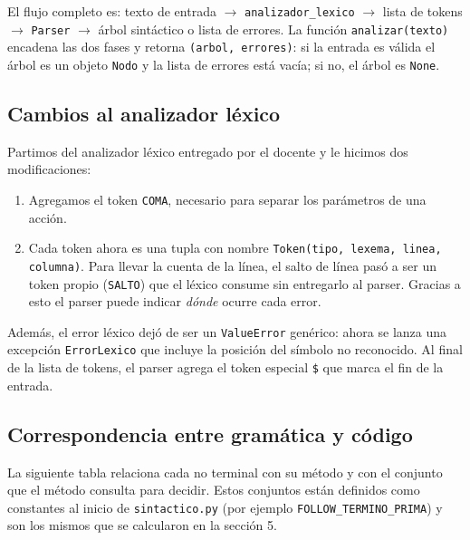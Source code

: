 El flujo completo es: texto de entrada $\rightarrow$ \texttt{analizador\_lexico} $\rightarrow$ lista de tokens $\rightarrow$ \texttt{Parser} $\rightarrow$ árbol sintáctico o lista de errores. La función \texttt{analizar(texto)} encadena las dos fases y retorna \texttt{(arbol, errores)}: si la entrada es válida el árbol es un objeto \texttt{Nodo} y la lista de errores está vacía; si no, el árbol es \texttt{None}.

\subsection{Cambios al analizador léxico}

Partimos del analizador léxico entregado por el docente y le hicimos dos modificaciones:

\begin{enumerate}
    \item Agregamos el token \texttt{COMA}, necesario para separar los parámetros de una acción.
    \item Cada token ahora es una tupla con nombre \texttt{Token(tipo, lexema, linea, columna)}. Para llevar la cuenta de la línea, el salto de línea pasó a ser un token propio (\texttt{SALTO}) que el léxico consume sin entregarlo al parser. Gracias a esto el parser puede indicar \emph{dónde} ocurre cada error.
\end{enumerate}

Además, el error léxico dejó de ser un \texttt{ValueError} genérico: ahora se lanza una excepción \texttt{ErrorLexico} que incluye la posición del símbolo no reconocido. Al final de la lista de tokens, el parser agrega el token especial \texttt{\$} que marca el fin de la entrada.

\subsection{Correspondencia entre gramática y código}

La siguiente tabla relaciona cada no terminal con su método y con el conjunto que el método consulta para decidir. Estos conjuntos están definidos como constantes al inicio de \texttt{sintactico.py} (por ejemplo \texttt{FOLLOW\_TERMINO\_PRIMA}) y son los mismos que se calcularon en la sección 5.

